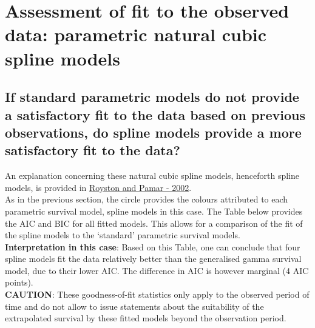 \documentclass[
]{article}
\begin{document}
\newpage

\hypertarget{assessment-of-fit-to-the-observed-data-parametric-natural-cubic-spline-models}{%
\section{Assessment of fit to the observed data: parametric natural
cubic spline
models}\label{assessment-of-fit-to-the-observed-data-parametric-natural-cubic-spline-models}}

\hypertarget{if-standard-parametric-models-do-not-provide-a-satisfactory-fit-to-the-data-based-on-previous-observations-do-spline-models-provide-a-more-satisfactory-fit-to-the-data}{%
\subsection{If standard parametric models do not provide a satisfactory
fit to the data based on previous observations, do spline models provide
a more satisfactory fit to the
data?}\label{if-standard-parametric-models-do-not-provide-a-satisfactory-fit-to-the-data-based-on-previous-observations-do-spline-models-provide-a-more-satisfactory-fit-to-the-data}}

An explanation concerning these natural cubic spline models, henceforth
spline models, is provided in
\href{https://doi.org/10.1002/sim.1203}{Royston and Pamar - 2002}.\\
As in the previous section, the circle provides the colours attributed
to each parametric survival model, spline models in this case. The Table
below provides the AIC and BIC for all fitted models. This allows for a
comparison of the fit of the spline models to the `standard' parametric
survival models.\\
\textbf{Interpretation in this case}: Based on this Table, one can
conclude that four spline models fit the data relatively better than the
generalised gamma survival model, due to their lower AIC. The difference
in AIC is however marginal (4 AIC points).\\
\textbf{CAUTION}: These goodness-of-fit statistics only apply to the
observed period of time and do not allow to issue statements about the
suitability of the extrapolated survival by these fitted models beyond
the observation period.
\end{document}
